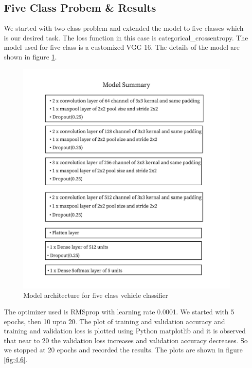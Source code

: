 \subsection{Five Class Probem \& Results}
We started with two class problem and extended the model to five classes
which is our desired task. The loss function in this case is categorical\_crossentropy.
The model used for five class is a customized VGG-16. The details of the
model are shown in figure \ref{model_summary}.
\begin{figure}[H]
    \centering
    \captionsetup{justification = centering}
    \includegraphics[scale = 0.8]{CHAPTERS/Chapter-4/Images/summary.jpg}
    \caption{Model architecture for five class vehicle classifier} 
    \label{model_summary}
\end{figure}
\noindent The optimizer used is RMSprop with
learning rate 0.0001. We started with 5 epochs, then 10 upto 20. The plot of training
and validation accuracy and training and validation loss is plotted using Python
matplotlib and it is observed that near to 20 the validation loss
increases and validation accuracy decreases. So we stopped at 20 epochs
and recorded the results. The plots are shown in
figure \ref{fig:4.6}.
